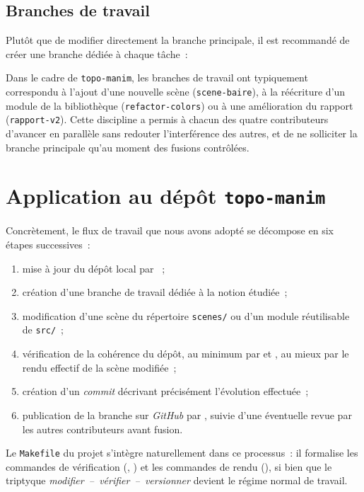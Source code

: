 \documentclass[12pt, a4paper, openany]{report}
\begin{document}
	\subsection{Branches de travail}

	Plutôt que de modifier directement la branche principale, il est recommandé de créer une branche dédiée à chaque tâche~:


	Dans le cadre de \texttt{topo-manim}, les branches de travail ont typiquement correspondu à l’ajout d’une nouvelle scène (\texttt{scene-baire}), à la réécriture d’un module de la bibliothèque (\texttt{refactor-colors}) ou à une amélioration du rapport (\texttt{rapport-v2}). Cette discipline a permis à chacun des quatre contributeurs d’avancer en parallèle sans redouter l’interférence des autres, et de ne solliciter la branche principale qu’au moment des fusions contrôlées.

	\section{Application au dépôt \texttt{topo-manim}}

	Concrètement, le flux de travail que nous avons adopté se décompose en six étapes successives~:

	\begin{enumerate}
		\item mise à jour du dépôt local par ~;
		\item création d’une branche de travail dédiée à la notion étudiée~;
		\item modification d’une scène du répertoire \texttt{scenes/} ou d’un module réutilisable de \texttt{src/}~;
		\item vérification de la cohérence du dépôt, au minimum par  et , au mieux par le rendu effectif de la scène modifiée~;
		\item création d’un \textit{commit} décrivant précisément l’évolution effectuée~;
		\item publication de la branche sur \textit{GitHub} par , suivie d’une éventuelle revue par les autres contributeurs avant fusion.
	\end{enumerate}

	Le \texttt{Makefile} du projet s’intègre naturellement dans ce processus~: il formalise les commandes de vérification (, ) et les commandes de rendu (), si bien que le triptyque \emph{modifier~--~vérifier~--~versionner} devient le régime normal de travail.
\end{document}
